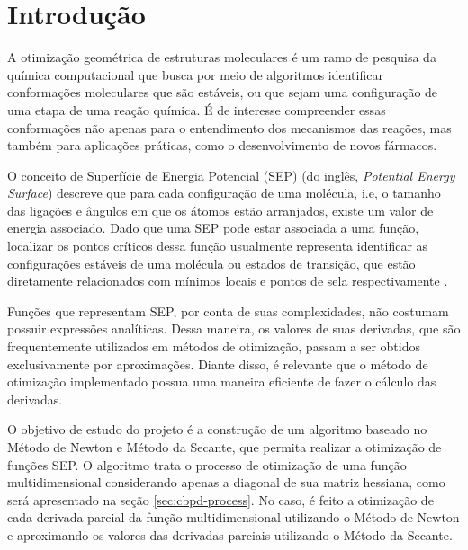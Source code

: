 \section{Introdução}

A otimização geométrica de estruturas moleculares é um ramo de pesquisa da química
computacional que busca por meio de algoritmos identificar conformações moleculares que
são estáveis, ou que sejam uma configuração de uma etapa de uma reação química. É de interesse compreender essas conformações não apenas para o entendimento dos mecanismos das reações, mas também para aplicações práticas, como o desenvolvimento de novos fármacos.

O conceito de Superfície de Energia Potencial (SEP) (do inglês, \textit{Potential Energy Surface}) descreve que para cada configuração de uma molécula, i.e, o tamanho das ligações e ângulos em que os átomos estão arranjados, existe um valor de energia associado. Dado que uma SEP pode estar associada a uma função, localizar os pontos críticos dessa função usualmente representa identificar as configurações estáveis de uma molécula ou estados de transição, que estão diretamente relacionados com mínimos locais e pontos de sela respectivamente \cite{geometry_optimization}.

Funções que representam SEP, por conta de suas complexidades, não costumam possuir expressões analíticas. Dessa maneira, os valores de suas derivadas, que são frequentemente utilizados em métodos de otimização, passam a ser obtidos  exclusivamente por aproximações. Diante disso, é relevante que o método de otimização implementado possua uma maneira eficiente de fazer o cálculo das derivadas. 

O objetivo de estudo do projeto é a construção de um algoritmo baseado no Método de Newton e Método da Secante, que permita realizar a otimização de funções SEP. O algoritmo trata o processo de otimização de uma função multidimensional considerando apenas a diagonal de sua matriz hessiana, como será apresentado na seção \ref{sec:cbpd-process}. No caso, é feito a otimização de cada derivada parcial da função multidimensional utilizando o Método de Newton e aproximando os valores das derivadas parciais utilizando o Método da Secante.

